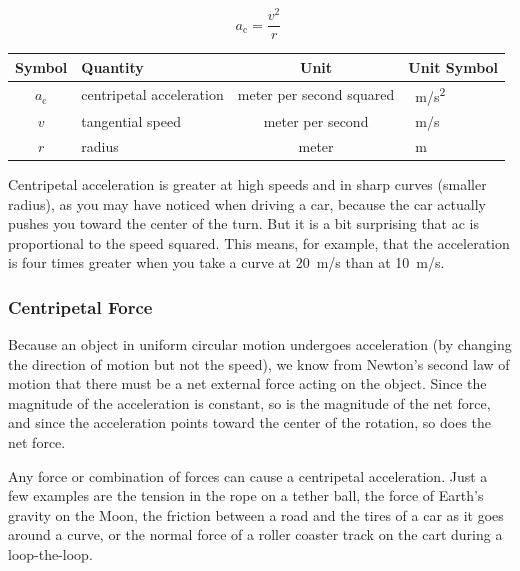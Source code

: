 \documentclass[main-physics.tex]{subfiles}
\begin{document}
\begin{equation} \label{5vsZ8y}
    a_{\text{c}} = \frac{v^2}{r}\ 
\end{equation}

\begin{center}
    \begin{tabular}{cl|cl}
    \hline
    \textbf{Symbol} & \textbf{Quantity} & \textbf{Unit} & \textbf{Unit Symbol}  \\
    \hline\hline
    \rule{0pt}{2.5ex}
        $a_{\text{c}}$ & centripetal acceleration & meter per second squared & \SI{}{m/s^2}\\
        $v$ & tangential speed & meter per second & \SI{}{m/s} \\
        $r$ & radius & meter & \SI{}{m}\\
    \hline
    \end{tabular}
\end{center}

Centripetal acceleration is greater at high speeds and in sharp curves (smaller radius), as you may have noticed when driving a car, because the car actually pushes you toward the center of the turn. But it is a bit surprising that ac is proportional to the speed squared. This means, for example, that the acceleration is four times greater when you take a curve at \SI{20}{m/s} than at \SI{10}{m/s}.

\subsubsection*{Centripetal Force}

Because an object in uniform circular motion undergoes acceleration (by changing the direction of motion but not the speed), we know from Newton's second law of motion that there must be a net external force acting on the object. Since the magnitude of the acceleration is constant, so is the magnitude of the net force, and since the acceleration points toward the center of the rotation, so does the net force.

\vspace{1em}

Any force or combination of forces can cause a centripetal acceleration. Just a few examples are the tension in the rope on a tether ball, the force of Earth's gravity on the Moon, the friction between a road and the tires of a car as it goes around a curve, or the normal force of a roller coaster track on the cart during a loop-the-loop.

\vspace{1em}
\end{document}
